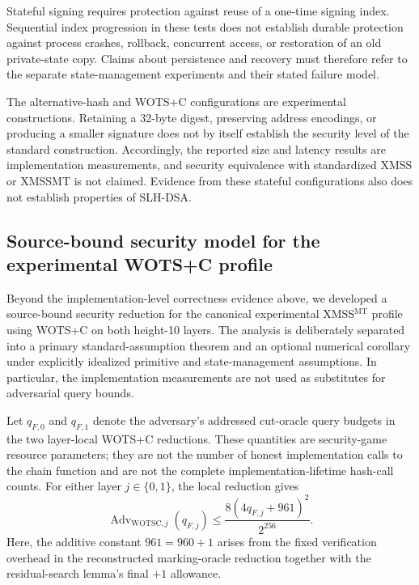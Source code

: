 \documentclass[pdflatex,sn-mathphys-num]{sn-jnl}
\begin{document}
Stateful signing requires protection against reuse of a one-time signing
index. Sequential index progression in these tests does not establish
durable protection against process crashes, rollback, concurrent access,
or restoration of an old private-state copy. Claims about persistence and
recovery must therefore refer to the separate state-management experiments
and their stated failure model.

The alternative-hash and WOTS+C configurations are experimental
constructions. Retaining a 32-byte digest, preserving address encodings,
or producing a smaller signature does not by itself establish the security
level of the standard construction. Accordingly, the reported size and
latency results are implementation measurements, and security equivalence
with standardized XMSS or XMSSMT is not claimed. Evidence from these
stateful configurations also does not establish properties of SLH-DSA.


\subsection{Source-bound security model for the experimental WOTS+C profile}
\label{subsec:wotsc_security_model}

Beyond the implementation-level correctness evidence above, we developed a
source-bound security reduction for the canonical experimental
XMSS$^{\mathrm{MT}}$ profile using WOTS+C on both height-10 layers. The
analysis is deliberately separated into a primary standard-assumption theorem
and an optional numerical corollary under explicitly idealized primitive and
state-management assumptions. In particular, the implementation measurements
are not used as substitutes for adversarial query bounds.

Let $q_{F,0}$ and $q_{F,1}$ denote the adversary's addressed cut-oracle query
budgets in the two layer-local WOTS+C reductions. These quantities are
security-game resource parameters; they are not the number of honest
implementation calls to the chain function and are not the complete
implementation-lifetime hash-call counts. For either layer $j\in\{0,1\}$,
the local reduction gives
\[
  \operatorname{Adv}_{\mathrm{WOTSC},j}(q_{F,j})
  \le
  \frac{8(4q_{F,j}+961)^2}{2^{256}}.
\]
Here, the additive constant $961=960+1$ arises from the fixed verification
overhead in the reconstructed marking-oracle reduction together with the
residual-search lemma's final $+1$ allowance.
\end{document}
